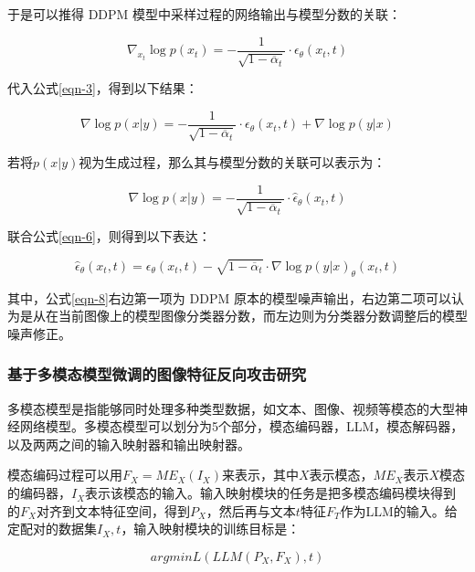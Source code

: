 于是可以推得 DDPM 模型中采样过程的网络输出与模型分数的关联：

\begin{equation}\label{eqn-5}
      \nabla_{x_t} \log p(x_t) = - \frac{1}{\sqrt{1-\overline{\alpha}_t}} \cdot\epsilon_\theta(x_t,t)
\end{equation}

代入公式\eqref{eqn-3}，得到以下结果：

\begin{equation}\label{eqn-6}
      \nabla \log p(x|y) = - \frac{1}{\sqrt{1-\overline{\alpha}_t}} \cdot\epsilon_\theta(x_t,t)
      + \nabla \log p(y|x)
\end{equation}

若将$p(x|y)$视为生成过程，那么其与模型分数的关联可以表示为：

\begin{equation}\label{eqn-7}
      \nabla \log p(x|y) = - \frac{1}{\sqrt{1-\overline{\alpha}_t}} \cdot\hat{\epsilon}_\theta(x_t,t)
\end{equation}

联合公式\eqref{eqn-6}，则得到以下表达：

\begin{equation}\label{eqn-8}
      \hat{\epsilon}_\theta(x_t,t) = \epsilon_\theta(x_t,t) -\sqrt{1-\overline{\alpha}_t} \cdot \nabla \log p(y|x)_\theta(x_t,t)
\end{equation}

其中，公式\eqref{eqn-8}右边第一项为 DDPM 原本的模型噪声输出，右边第二项可以认为是从在当前图像上的模型图像分类器分数，而左边则为分类器分数调整后的模型噪声修正。

\subsubsection{基于多模态模型微调的图像特征反向攻击研究}
多模态模型是指能够同时处理多种类型数据，如文本、图像、视频等模态的大型神经网络模型。多模态模型可以划分为5个部分，模态编码器，LLM，模态解码器，以及两两之间的输入映射器和输出映射器。
\par
模态编码过程可以用$F_X = ME_X(I_X)$来表示，其中$X$表示模态，$ME_X$表示$X$模态的编码器，$I_X$表示该模态的输入。输入映射模块的任务是把多模态编码模块得到的$F_X$对齐到文本特征空间，得到$P_X$，然后再与文本$t$特征$F_T$作为LLM的输入。给定配对的数据集${I_X,t}$，输入映射模块的训练目标是：

\begin{equation}\label{eqn-9}
      argmin L(LLM(P_X,F_X),t)
\end{equation}

